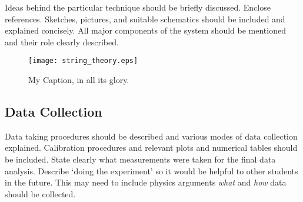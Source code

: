 \documentclass[11pt,letterpaper,onecolumn]{article}
\begin{document}
Ideas behind the particular technique should be briefly
discussed. Enclose references. Sketches, pictures, and
suitable schematics should be included and explained
concisely. All major components of the system should be
mentioned and their role clearly described.




\begin{figure}[h]
 \begin{center}
 \texttt{[image: string\_theory.eps]}
 \caption{ My Caption, in all its glory.\label{fig:apparatus} }
 \end{center}
\end{figure}

\subsection{Data Collection}

Data taking procedures should be described and various modes of
data collection explained. Calibration procedures and
relevant plots and numerical tables should be included.
State clearly what measurements were taken for the final
data analysis. Describe `doing the experiment' so it would
be helpful to other students in the future. This may need
to include physics arguments {\em what } and {\em how } data should
be collected.

\end{document}
